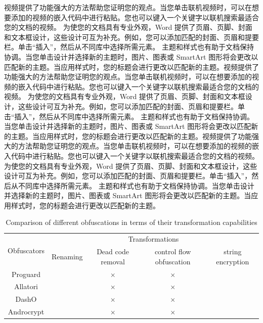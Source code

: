 视频提供了功能强大的方法帮助您证明您的观点。当您单击联机视频时，可以在想要添加的视频的嵌入代码中进行粘贴。您也可以键入一个关键字以联机搜索最适合您的文档的视频。
为使您的文档具有专业外观，Word 提供了页眉、页脚、封面和文本框设计，这些设计可互为补充。例如，您可以添加匹配的封面、页眉和提要栏。单击“插入”，然后从不同库中选择所需元素。
主题和样式也有助于文档保持协调。当您单击设计并选择新的主题时，图片、图表或 SmartArt 图形将会更改以匹配新的主题。当应用样式时，您的标题会进行更改以匹配新的主题。视频提供了功能强大的方法帮助您证明您的观点。当您单击联机视频时，可以在想要添加的视频的嵌入代码中进行粘贴。您也可以键入一个关键字以联机搜索最适合您的文档的视频。
为使您的文档具有专业外观，Word 提供了页眉、页脚、封面和文本框设计，这些设计可互为补充。例如，您可以添加匹配的封面、页眉和提要栏。单击“插入”，然后从不同库中选择所需元素。
主题和样式也有助于文档保持协调。当您单击设计并选择新的主题时，图片、图表或 SmartArt 图形将会更改以匹配新的主题。当应用样式时，您的标题会进行更改以匹配新的主题。视频提供了功能强大的方法帮助您证明您的观点。当您单击联机视频时，可以在想要添加的视频的嵌入代码中进行粘贴。您也可以键入一个关键字以联机搜索最适合您的文档的视频。
为使您的文档具有专业外观，Word 提供了页眉、页脚、封面和文本框设计，这些设计可互为补充。例如，您可以添加匹配的封面、页眉和提要栏。单击“插入”，然后从不同库中选择所需元素。
主题和样式也有助于文档保持协调。当您单击设计并选择新的主题时，图片、图表或 SmartArt 图形将会更改以匹配新的主题。当应用样式时，您的标题会进行更改以匹配新的主题。

\begin{table}
	\centering
	\caption{Comparison of different obfuscations in terms of their transformation capabilities}
	\begin{tabular}{ccccc} %
		\toprule
		\multirow{2}{*}{Obfuscators} & \multicolumn{4}{c}{Transformations}   \\
		\cline{2-5}  %
		&    Renaming & Dead code removal & control flow obfuscation & string encryption \\
		\midrule
		Proguard &  \checkmark & $\times$  & $\times$ & \checkmark   \\
		Allatori & \checkmark & $\times$  & $\times$ & \checkmark \\
		DashO & \checkmark & $\times$  & $\times$ & \checkmark \\
		Androcrypt & \checkmark & $\times$  & $\times$ & \checkmark  \\
		\bottomrule
	\end{tabular}
	\label{tbl:table1}
\end{table}


